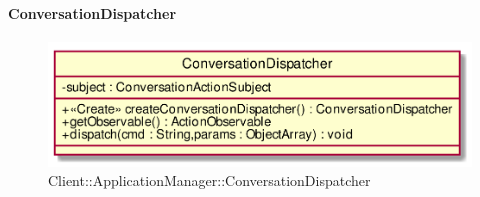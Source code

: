 \hypertarget{ConversationDispatcher_label}{\paragraph{ConversationDispatcher}}
\begin{figure}[h]
	\centering
	\includegraphics[width=\textwidth,height=\textheight,keepaspectratio]{images/ClassConversationDispatcher.png}
	\caption{Client::ApplicationManager::ConversationDispatcher}
\end{figure}

